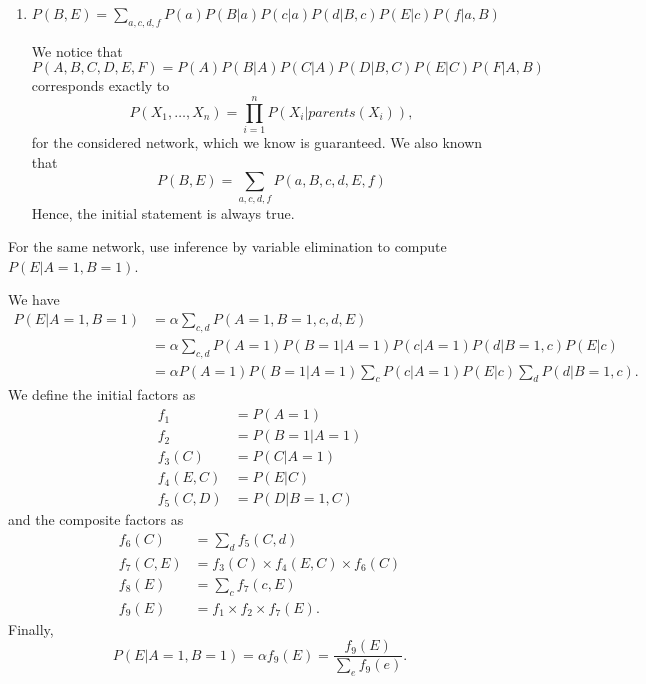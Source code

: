 \documentclass[11pt, a4paper]{article}
\begin{document}
\begin{enumerate}
    \item $P(B, E) = \sum_{a, c, d, f} P(a) P(B | a) P(c | a) P(d | B, c) P(E | c) P(f | a, B)$

    \begin{solution}
        We notice that
        \begin{equation*}
            P(A, B, C, D, E, F) = P(A) P(B | A) P(C | A) P(D | B, C) P(E | C) P(F | A, B)
        \end{equation*}
        corresponds exactly to
        \begin{equation*}
            P(X_1, \dots, X_n) = \prod_{i = 1}^n P(X_i | parents(X_i)) ,
        \end{equation*}
        for the considered network, which we know is guaranteed. We also known that
        \begin{equation*}
            P(B, E) = \sum_{a, c, d, f} P(a, B, c, d, E, f)
        \end{equation*}
        Hence, the initial statement is always true.
    \end{solution}
\end{enumerate}

For the same network, use inference by variable elimination to compute $P(E | A = 1, B = 1)$.

\begin{solution}
    We have
    \begin{align*}
        P(E | A = 1, B = 1) & = \alpha \sum_{c, d} P(A = 1, B = 1, c, d, E)\\
        & = \alpha \sum_{c, d} P(A = 1) P(B = 1| A = 1) P(c| A = 1) P(d|B = 1, c) P(E|c) \\
        & = \alpha P(A = 1) P(B = 1 | A = 1) \sum_{c} P(c|A = 1) P(E|c)\sum_d P(d|B = 1,c) .
    \end{align*}
    We define the initial factors as
    \begin{align*}
        f_1 & = P(A=1) \\
        f_2 & = P(B=1 | A=1) \\
        f_3(C) & = P(C|A=1) \\
        f_4(E, C) & = P(E|C) \\
        f_5(C, D) & = P(D|B=1, C)
    \end{align*}
    and the composite factors as
    \begin{align*}
        f_6(C) & = \sum_d f_5(C, d) \\
        f_7(C, E) & = f_3(C) \times f_4(E, C) \times f_6(C) \\
        f_8(E) & = \sum_c f_7(c, E) \\
        f_9(E) & = f_1 \times f_2 \times f_7(E) .
    \end{align*}
    Finally,
    \begin{equation*}
        P(E | A = 1, B = 1) = \alpha f_9(E) = \frac{f_9(E)}{\sum_e f_9(e)}.
    \end{equation*}
\end{solution}
\end{document}
